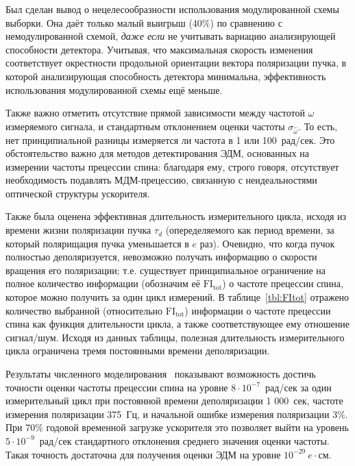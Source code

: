 Был сделан вывод о нецелесообразности использования модулированной схемы выборки. Она даёт только
малый выигрыш (40\%) по сравнению с немодулированной схемой, \emph{даже если} не учитывать вариацию 
анализирующей способности детектора. Учитывая, что максимальная скорость изменения соответствует
окрестности продольной ориентации вектора поляризации пучка, в которой анализирующая способность 
детектора минимальна, эффективность использования модулированной схемы ещё меньше.

Также важно отметить отсутствие прямой зависимости между частотой $\omega$ измеряемого сигнала, 
и стандартным отклонением оценки частоты $\sigma_{\hat\omega}$. То есть, нет принципиальной разницы
измеряется ли частота в 1 или 100~рад/сек. Это обстоятельство важно для методов детектирования ЭДМ, 
основанных на измерении частоты прецессии спина: благодаря ему, строго говоря, 
отсутствует необходимость подавлять МДМ-прецессию, связанную с неидеальностями 
оптической структуры ускорителя.

Также была оценена эффективная длительность измерительного цикла, 
исходя из времени жизни поляризации пучка  $\tau_d$ (опеределяемого как период времени, 
за который полярищация пучка уменьшается в $e$ раз). Очевидно, что когда пучок полностью деполяризуется, 
невозможно получать информацию о скорости вращения его поляризации; т.е. 
существует принципиальное ограничение на полное количество информации (обозначим её $\mathrm{FI_{tot}}$) 
о частоте прецессии спина, которое можно получить за один цикл измерений.
В таблице~\ref{tbl:FItot} отражено количество выбранной (относительно $\mathrm{FI_{tot}}$) информации 
о частоте прецессии спина как функция длительности цикла, а также соответствующее ему отношение
сигнал/шум. Исходя из данных таблицы, полезная длительность измерительного цикла 
ограничена тремя постоянными времени деполяризации.

Результаты численного моделирования~\cite{Aksentev:Stats} показывают 
возможность достичь точности оценки частоты прецессии спина 
на уровне ${8\cdot 10^{-7}}$~рад/сек за один измерительный цикл при постоянной времени деполяризации 
1 000~сек, частоте измерения поляризации 375~Гц, и начальной ошибке измерения поляризации 3\%. 
При 70\%  годовой временной загрузке ускорителя это позволяет выйти на уровень 
${5\cdot 10^{-9}}$~рад/сек стандартного отклонения среднего значения оценки частоты. 
Такая точность достаточна для получения оценки ЭДМ на уровне $10^{-29}~e\cdot$см.

